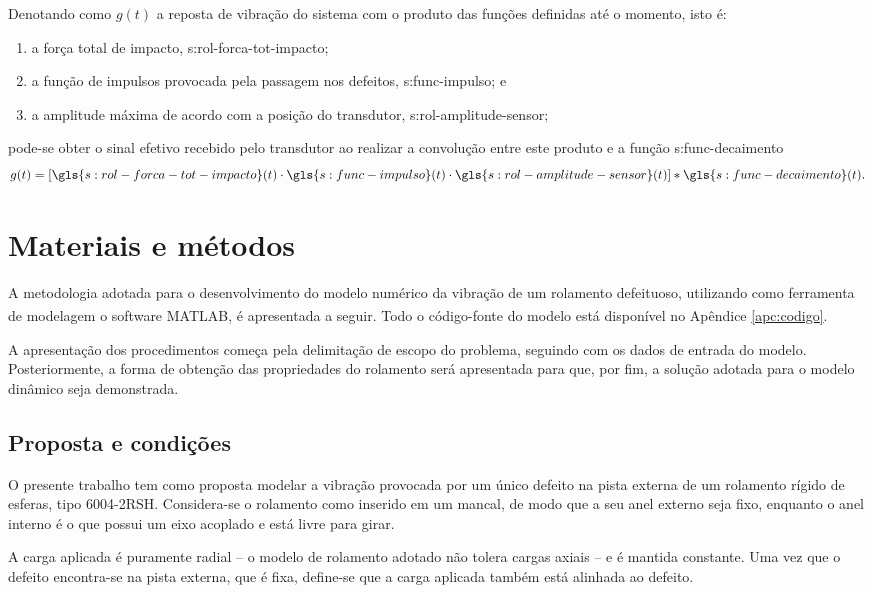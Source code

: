 \documentclass[12pt,oneside,english,brazil,lmodern,siglas,simbolos,cite=num]{ucsmonograph}
\begin{document}
	Denotando como $ g(t) $ a reposta de vibração do sistema com o produto das funções definidas até o momento, isto é:
	\begin{enumerate}
		\item a força total de impacto, \gls{s:rol-forca-tot-impacto};
		\item a função de impulsos provocada pela passagem nos defeitos, \gls{s:func-impulso}; e
		\item a amplitude máxima de acordo com a posição do transdutor, \gls{s:rol-amplitude-sensor};
	\end{enumerate}
	pode-se obter o sinal efetivo recebido pelo transdutor ao realizar a convolução entre este produto e a função \gls{s:func-decaimento} \cite{mcfadden:1984,cong:2013}
	\begin{equation}
		g(t) = [\gls{s:rol-forca-tot-impacto}(t)\cdot \gls{s:func-impulso}(t)\cdot \gls{s:rol-amplitude-sensor}(t)]\ast\gls{s:func-decaimento}(t).
	\end{equation}
	
	\chapter{Materiais e métodos}
	A metodologia adotada para o desenvolvimento do modelo numérico da vibração de um rolamento defeituoso, utilizando como ferramenta de modelagem o \foreignlanguage{english}{software} MATLAB\textsuperscript\textregistered, é apresentada a seguir.
	Todo o código-fonte do modelo está disponível no Apêndice \ref{apc:codigo}.
	
	A apresentação dos procedimentos começa pela delimitação de escopo do problema, seguindo com os dados de entrada do modelo.
	Posteriormente, a forma de obtenção das propriedades do rolamento será apresentada para que, por fim, a solução adotada para o modelo dinâmico seja demonstrada.
	
	\section{Proposta e condições} \label{sec:proposta-condicoes}
	O presente trabalho tem como proposta modelar a vibração provocada por um único defeito na pista externa de um rolamento rígido de esferas, tipo 6004-2RSH.
	Considera-se o rolamento como inserido em um mancal, de modo que a seu anel externo seja fixo, enquanto o anel interno é o que possui um eixo acoplado e está livre para girar.
	
	A carga aplicada é puramente radial -- o modelo de rolamento adotado não tolera cargas axiais -- e é mantida constante.
	Uma vez que o defeito encontra-se na pista externa, que é fixa, define-se que a carga aplicada também está alinhada ao defeito.
	
\end{document}
